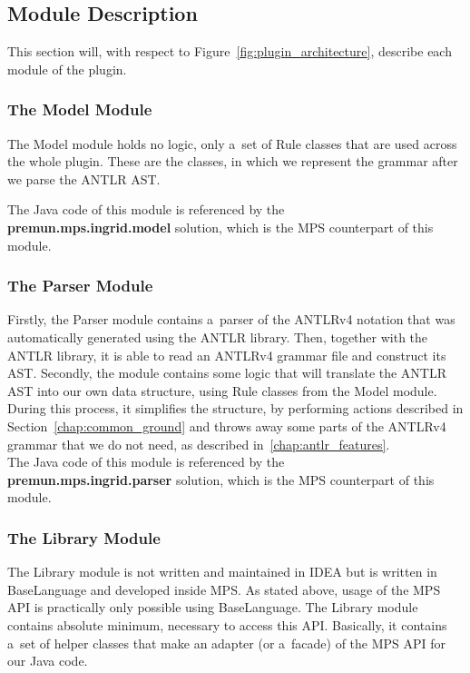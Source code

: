 \subsection{Module Description}

This section will, with respect to Figure~\ref{fig:plugin_architecture}, describe each module of the plugin.

\subsubsection{The Model Module}

The Model module holds no logic, only a~set of Rule classes that are used across the whole plugin.
These are the classes, in which we represent the grammar after we parse the ANTLR AST.

The Java code of this module is referenced by the \\\textbf{premun.mps.ingrid.model} solution, which is the MPS counterpart of this module.

\subsubsection{The Parser Module}

Firstly, the Parser module contains a~parser of the ANTLRv4 notation that was automatically generated using the ANTLR library.
Then, together with the ANTLR library, it is able to read an ANTLRv4 grammar file and construct its AST.
Secondly, the module contains some logic that will translate the ANTLR AST into our own data structure, using Rule classes from the Model module.
During this process, it simplifies the structure, by performing actions described in Section~\ref{chap:common_ground} and throws away some parts of the ANTLRv4 grammar that we do not need, as described in~\ref{chap:antlr_features}.
\\

The Java code of this module is referenced by the \\\textbf{premun.mps.ingrid.parser} solution, which is the MPS counterpart of this module.

\subsubsection{The Library Module}

The Library module is not written and maintained in IDEA but is written in BaseLanguage and developed inside MPS.
As stated above, usage of the MPS API is practically only possible using BaseLanguage.
The Library module contains absolute minimum, necessary to access this API.
Basically, it contains a~set of helper classes that make an adapter (or a~facade) of the MPS API for our Java code.
\\

